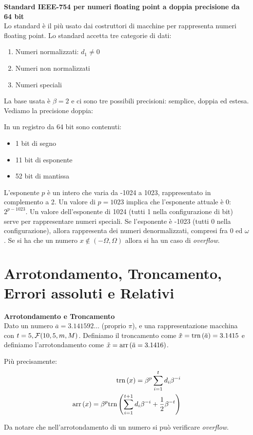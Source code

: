 \begin{defn}
    \textbf{Standard IEEE-754 per numeri floating point a doppia precisione da 64 bit} \\ 
    Lo standard è il più usato dai costruttori di macchine per rappresenta numeri floating point. Lo standard accetta tre categorie di dati:
    \begin{enumerate}
        \item Numeri normalizzati: $d_1 \neq 0$
        \item Numeri non normalizzati
        \item Numeri speciali
    \end{enumerate}
    La base usata è $\beta = 2$ e ci sono tre possibili precisioni: semplice, doppia ed estesa. Vediamo la precisione doppia:

    In un registro da 64 bit sono contenuti:
    \begin{itemize}
        \item 1 bit di segno 
        \item 11 bit di esponente 
        \item 52 bit di mantissa
    \end{itemize}

    L'esponente $p$ è un intero che varia da -1024 a 1023, rappresentato in complemento a 2. Un valore di $p = 1023$ implica che l'esponente attuale è 0: $2^{p - 1023}$. Un valore dell'esponente di 1024 (tutti 1 nella configurazione di bit) serve per rappresentare numeri speciali. Se l'esponente è -1023 (tutti 0 nella configurazione), allora rappresenta dei numeri denormalizzati, compresi fra 0 ed $\omega$. Se si ha che
    un numero $x \notin (-\Omega, \Omega)$ allora si ha un caso di \textit{overflow}.
\end{defn}

\section{Arrotondamento, Troncamento, Errori assoluti e Relativi}

\begin{defn}
    \textbf{Arrotondamento e Troncamento} \\
    Dato un numero $\overbar{a} = 3.141592\hdots$ (proprio $\pi$),
    e una rappresentazione macchina con $t = 5, \mathcal{F}(10,5,m,M)$.
    Definiamo il troncamento come
    $\tilde{x} = \trn{\overbar{a}} = 3.1415$ e definiamo
    l'arrotondamento come $\tilde{x} = \arr{\overbar{a} = 3.1416}$.

    Più precisamente:
    \begin{eqnarray*}
        \text{trn}\left(x\right) = \beta^p \sum_{i=1}^{t} d_i \beta^{-i} \\
        \text{arr}\left(x\right) = \beta^p \text{trn}\left(\sum_{i=1}^{t+1} d_i \beta^{-i} + \frac{1}{2} \beta^{-t}\right)
    \end{eqnarray*}

    Da notare che nell'arrotondamento di un numero si può verificare \textit{overflow}.
\end{defn}


